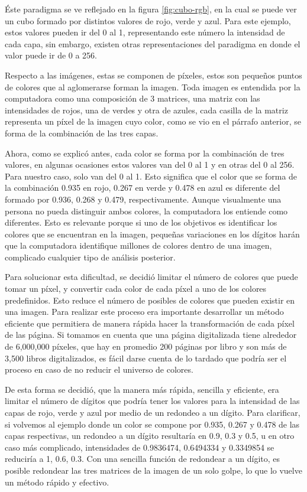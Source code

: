 Éste paradigma se ve reflejado en la figura \ref{fig:cubo-rgb}, en la cual se puede ver un cubo formado por distintos valores de rojo, verde y azul. Para este ejemplo, estos valores pueden ir del 0 al 1, representando este número la intensidad de cada capa, sin embargo, existen otras representaciones del paradigma en donde el valor puede ir de 0 a 256.

Respecto a las imágenes, estas se componen de píxeles, estos son pequeños puntos de colores que al aglomerarse forman la imagen. Toda imagen es entendida por la computadora como una composición de 3 matrices, una matriz con las intensidades de rojos, una de verdes y otra de azules, cada casilla de la matriz representa un píxel de la imagen cuyo color, como se vio en el párrafo anterior, se forma de la combinación de las tres capas.

Ahora, como se explicó antes, cada color se forma por la combinación de tres valores, en algunas ocasiones estos valores van del 0 al 1 y en otras del 0 al 256. Para nuestro caso, solo van del 0 al 1. Esto significa que el color que se forma de la combinación 0.935 en rojo, 0.267 en verde y 0.478 en azul es diferente del formado por 0.936, 0.268 y 0.479, respectivamente. Aunque visualmente una persona no pueda distinguir ambos colores,  la computadora los entiende como diferentes. Esto es relevante porque si uno de los objetivos es identificar los colores que se encuentran en la imagen, pequeñas variaciones en los dígitos harán que la computadora identifique millones de colores dentro de una imagen,  complicado cualquier tipo de análisis posterior. 

Para solucionar esta dificultad, se decidió limitar el número de colores que puede tomar un píxel, y convertir cada color de cada píxel a uno de los colores predefinidos. Esto reduce el número de posibles de colores que pueden existir en una imagen. Para realizar este proceso era importante desarrollar un método eficiente que permitiera de manera rápida hacer la transformación de cada píxel de las página. Si tomamos en cuenta que una página digitalizada tiene alrededor de 6,000,000 píxeles, que hay en promedio 200 páginas por libro y son más de 3,500 libros digitalizados, es fácil darse cuenta de lo tardado que podría ser el proceso en caso de no reducir el universo de colores.

De esta forma se decidió, que la manera más rápida, sencilla y eficiente, era limitar el número de dígitos que podría tener los valores para la intensidad de las capas de rojo, verde y azul por medio de un redondeo a un dígito. Para clarificar, si volvemos al ejemplo donde un color se compone por 0.935, 0.267 y 0.478 de las capas respectivas, un redondeo a un dígito resultaría en 0.9, 0.3 y 0.5, u en otro caso más complicado, intensidades de 0.9836474, 0.6494334 y 0.3349854 se reduciría a 1, 0.6, 0.3. Con una sencilla función de redondear a un dígito, es posible redondear las tres matrices de la imagen de un solo golpe, lo que lo vuelve un método  rápido y efectivo.

